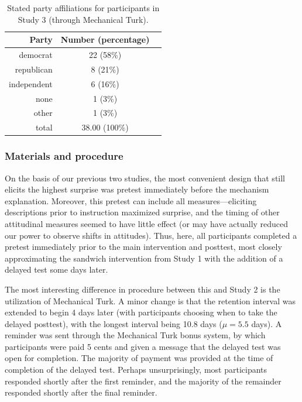 \begin{table}[ht]
    \caption{Stated party affiliations for participants in Study 3 (through
        Mechanical Turk).}
    \label{table:cco-mech-party}
\centering
\begin{tabular}{rcc}
  \toprule
 Party & Number (percentage) \\ 
  \midrule
  democrat     & 22 (58\%) \\ 
  republican   & 8 (21\%) \\ 
  independent  & 6 (16\%) \\ 
  none         & 1 (3\%) \\ 
  other        & 1 (3\%) \\ 
  \midrule
  total        & 38.00 (100\%) \\ 
   \bottomrule
\end{tabular}
\end{table}


\subsubsection{Materials and procedure}

On the basis of our previous two studies, the most convenient design that still
elicits the highest surprise was pretest immediately before the mechanism
explanation. Moreover, this pretest can include all measures---eliciting descriptions
prior to instruction maximized surprise, and the timing of other attitudinal
measures seemed to have little effect (or may have actually reduced our power to
observe shifts in attitudes). Thus, here, all participants completed a pretest
immediately prior to the main intervention and posttest, most closely
approximating the sandwich intervention from Study 1 with the addition of a
delayed test some days later.

The most interesting difference in procedure between this and Study 2 is the
utilization of Mechanical Turk. A minor change is that the retention interval
was extended to begin 4 days later (with participants choosing when to take the
delayed posttest), with the longest interval being 10.8 days
($\mu=5.5$ days). A reminder was sent through the Mechanical Turk bonus system,
by which participants were paid 5 cents and given a message that the delayed test
was open for completion. The majority of payment was provided at the time of
completion of the delayed test. Perhaps unsurprisingly, most participants
responded shortly after the first reminder, and the majority of the remainder
responded shortly after the final reminder.

